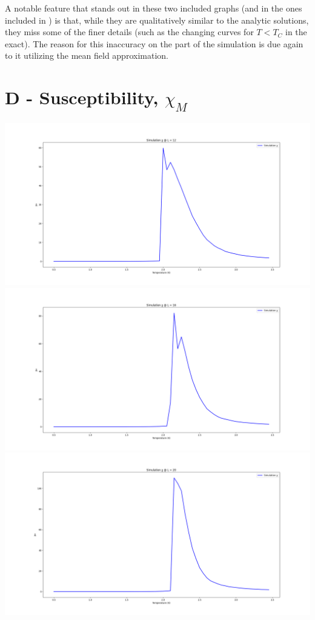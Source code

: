 \documentclass{article}
\begin{document}
		A notable feature that stands out in these two included graphs (and in the ones included in \cite{crock2}) is that, while they are qualitatively similar to the analytic solutions, they miss some of the finer details (such as the changing curves for $ T < T_C $ in the exact). The reason for this inaccuracy on the part of the simulation is due again to it utilizing the mean field approximation.
		
    \section{D - Susceptibility, $ \chi_M $}
    	\includegraphics[width=\textwidth]{D/D-L_12}
    	\includegraphics[width=\textwidth]{D/D-L_16}
    	\includegraphics[width=\textwidth]{D/D-L_20}
\end{document}
